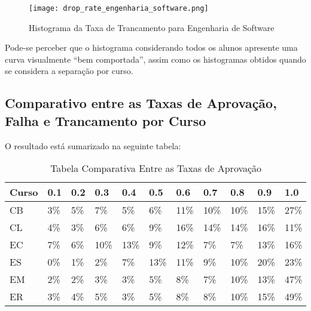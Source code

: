 \begin{figure}[!ht]
    \caption{Histograma da Taxa de Trancamento para Engenharia de Software}
    \centering
    \texttt{[image: drop\_rate\_engenharia\_software.png]}
    \label{drop_rate_eng_soft}
\end{figure}

Pode-se perceber que o histograma considerando todos os alunos apresente uma
curva visualmente ``bem comportada'', assim como os histogramas obtidos quando se considera a
separação por curso. \clearpage

\subsection{Comparativo entre as Taxas de Aprovação, Falha e Trancamento por Curso}
O resultado está sumarizado na seguinte tabela: 

\begin{table}
\begin{center}
        \begin{tabular}{|p{2cm}| p{1cm}| p{1cm}| p{1cm} | p{1cm} | p{1cm}| p{1cm}
                |p{1cm} | p{1cm} | p{1cm} | p{1cm}|}

        \hline
        \textbf{Curso} & \textbf{0.1} & \textbf{0.2} & \textbf{0.3} & 
        \textbf{0.4} & \textbf{0.5} & \textbf{0.6} & \textbf{0.7} & \textbf{0.8} &
        \textbf{0.9} & \textbf{1.0} \\
        \hline
        \hline
        CB & 3\% & 5\% & 7\% & 5\% & 6\% &
        11\% & 10\% & 10\% & 15\% & 27\% \\
        \hline
        \hline
        CL & 4\% & 3\% & 6\% & 6\% & 9\% &
        16\% & 14\% & 14\% & 16\% & 11\% \\
        \hline
        \hline
        EC & 7\% & 6\% & 10\% & 13\% & 9\% &
        12\% & 7\% & 7\% & 13\% & 16\% \\
        \hline
        \hline
        ES & 0\% & 1\% & 2\% & 7\% & 13\% &
        11\% & 9\% & 10\% & 20\% & 23\% \\
        \hline
        \hline
        EM & 2\% & 2\% & 3\% & 3\% & 5\% &
        8\% & 7\% & 10\% & 13\% & 47\% \\
        \hline
        \hline
        ER & 3\% & 4\% & 5\% & 3\% & 5\% &
        8\% & 8\% & 10\% & 15\% & 49\% \\
        \hline
\end{tabular}
\end{center}
\caption{Tabela Comparativa Entre as Taxas de Aprovação}
\end{table}

